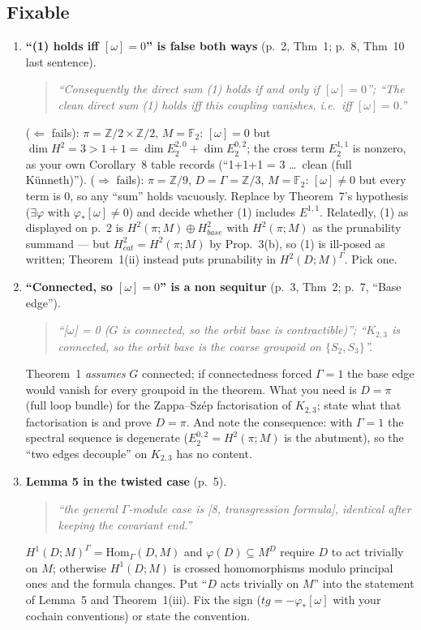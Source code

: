 \documentclass[11pt]{article}
\newcommand{\Z}{\mathbb{Z}}
\newcommand{\F}{\mathbb{F}}
\newenvironment{quoted}{\begin{quote}\small\itshape}{\end{quote}}
\begin{document}
\subsection*{Fixable}
\begin{enumerate}[label=F\arabic*.,leftmargin=*]
\item \textbf{``(1) holds iff $[\omega]=0$'' is false both ways} (p.~2, Thm~1; p.~8,
Thm~10 last sentence).
\begin{quoted}
``Consequently the direct sum (1) holds if and only if $[\omega]=0$''; ``The clean
direct sum (1) holds iff this coupling vanishes, i.e.\ iff $[\omega]=0$.''
\end{quoted}
($\Leftarrow$ fails): $\pi=\Z/2\times\Z/2$, $M=\F_2$: $[\omega]=0$ but
$\dim H^2=3>1+1=\dim E_2^{2,0}+\dim E_2^{0,2}$; the cross term $E_2^{1,1}$ is
nonzero, as your own Corollary~8 table records (``1+1+1 = 3 \ldots\ clean (full
Künneth)''). ($\Rightarrow$ fails): $\pi=\Z/9$, $D=\Gamma=\Z/3$, $M=\F_2$:
$[\omega]\ne0$ but every term is $0$, so any ``sum'' holds vacuously. Replace by
Theorem~7's hypothesis ($\exists\varphi$ with $\varphi_*[\omega]\ne0$) and decide whether
(1) includes $E^{1,1}$. Relatedly, (1) as displayed on p.~2 is
$H^2(\pi;M)\oplus H^2_{base}$ with $H^2(\pi;M)$ as the prunability summand --- but
$H^2_{cat}=H^2(\pi;M)$ by Prop.~3(b), so (1) is ill-posed as written; Theorem~1(ii)
instead puts prunability in $H^2(D;M)^\Gamma$. Pick one.

\item \textbf{``Connected, so $[\omega]=0$'' is a non sequitur} (p.~3, Thm~2; p.~7,
``Base edge'').
\begin{quoted}
``[$\omega$] = 0 ($G$ is connected, so the orbit base is contractible)''; ``$K_{2,3}$
is connected, so the orbit base is the coarse groupoid on $\{S_2,S_3\}$''.
\end{quoted}
Theorem~1 \emph{assumes} $G$ connected; if connectedness forced $\Gamma=1$ the base
edge would vanish for every groupoid in the theorem. What you need is $D=\pi$
(full loop bundle) for the Zappa--Szép factorisation of $K_{2,3}$; state what that
factorisation is and prove $D=\pi$. And note the consequence: with $\Gamma=1$ the
spectral sequence is degenerate ($E_2^{0,2}=H^2(\pi;M)$ is the abutment), so the
``two edges decouple'' on $K_{2,3}$ has no content.

\item \textbf{Lemma 5 in the twisted case} (p.~5).
\begin{quoted}
``the general $\Gamma$-module case is [8, transgression formula], identical after
keeping the covariant end.''
\end{quoted}
$H^1(D;M)^\Gamma=\mathrm{Hom}_\Gamma(D,M)$ and $\varphi(D)\subseteq M^D$ require $D$ to act
trivially on $M$; otherwise $H^1(D;M)$ is crossed homomorphisms modulo principal
ones and the formula changes. Put ``$D$ acts trivially on $M$'' into the statement
of Lemma~5 and Theorem~1(iii). Fix the sign ($tg=-\varphi_*[\omega]$ with your cochain
conventions) or state the convention.


\end{enumerate}
\end{document}
